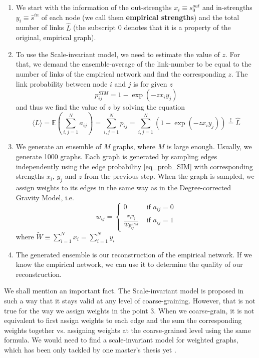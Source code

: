 \begin{enumerate}
    \item We start with the information of the out-strengths $x_i \equiv s_0^{out}$ and in-strengths $y_i \equiv \hat{s}^{in}$ of each node (we call them \textbf{empirical strengths}) and the total number of links $\hat{L}$ (the subscript 0 denotes that it is a property of the original, empirical graph). 
    \item To use the Scale-invariant model, we need to estimate the value of $z$. For that, we demand the ensemble-average of the link-number to be equal to the number of links of the empirical network and find the corresponding $z$. The link probability between node $i$ and $j$ is for given $z$ 
    \begin{equation}
        p_{ij}^{SIM} = 1 - \exp(-z x_i y_j)
        \label{eq_prob_SIM}
    \end{equation}
    and thus we find the value of $z$ by solving the equation
    \begin{equation}
        \langle L \rangle = \mathbb{E}(\sum_{i,j=1}^{N} a_{ij}) = \sum_{i,j=1}^{N} p_{ij} = \sum_{i,j=1}^{N} (1 - \exp(-z x_i y_j)) \overset{!}{=} \hat{L}
        \label{eq:z_fit}
    \end{equation}
    \item We generate an ensemble of $M$ graphs, where $M$ is large enough. Usually, we generate 1000 graphs. Each graph is generated by sampling edges independently using the edge probability \ref{eq_prob_SIM} with corresponding strengths $x_i$, $y_j$ and $z$ from the previous step. When the graph is sampled, we assign weights to its edges in the same way as in the Degree-corrected Gravity Model, i.e.
    \begin{equation}
        w_{ij} = \begin{cases}
            0 \qquad &\text{if } a_{ij} = 0\\
            \frac{x_i y_j}{\tilde{W} p_{ij}^{SIM}} &\text{if } a_{ij} = 1
        \end{cases}    
    \end{equation}
    where $\tilde{W} \equiv \sum_{i=1}^N x_i =  \sum_{i=1}^N y_i$
    \item The generated ensemble is our reconstruction of the empirical network. If we know the empirical network, we can use it to determine the quality of our reconstruction. 
\end{enumerate}

We shall mention an important fact. The Scale-invariant model is proposed in such a way that it stays valid at any level of coarse-graining. However, that is not true for the way we assign weights in the point 3. When we coarse-grain, it is not equivalent to first assign weights to each edge and the sum the corresponding weights together vs. assigning weights at the coarse-grained level using the same formula. We would need to find a scale-invariant model for weighted graphs, which has been only tackled by one master's thesis yet \cite{Verteletskyi}.

